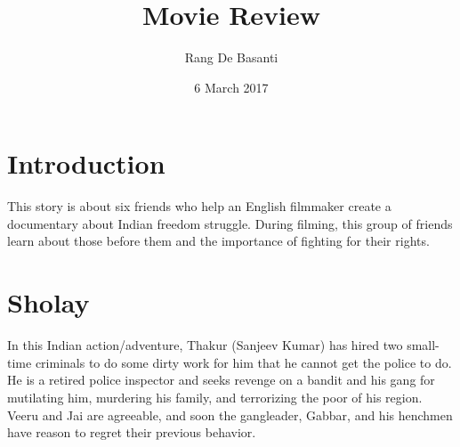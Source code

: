 \documentclass{article}
\title{Movie Review}
\author{Rang De Basanti}
\date{6 March 2017}
\begin{document}
\maketitle

\section{Introduction}
This story is about six friends who help an English filmmaker create a documentary about Indian freedom struggle. During filming, this group of friends learn about those before them and the importance of fighting for their rights. 

\section{Sholay}
In this Indian action/adventure, Thakur (Sanjeev Kumar) has hired two small-time criminals to do some dirty work for him that he cannot get the police to do. He is a retired police inspector and seeks revenge on a bandit and his gang for mutilating him, murdering his family, and terrorizing the poor of his region. Veeru and Jai are agreeable, and soon the gangleader, Gabbar, and his henchmen have reason to regret their previous behavior.
\end{document}
